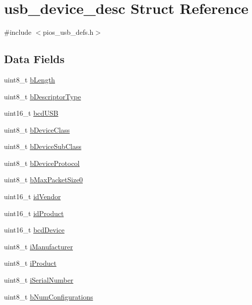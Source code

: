 \hypertarget{structusb__device__desc}{\section{usb\-\_\-device\-\_\-desc \-Struct \-Reference}
\label{structusb__device__desc}
}


{\ttfamily \#include $<$pios\-\_\-usb\-\_\-defs.\-h$>$}

\subsection*{\-Data \-Fields}
\begin{DoxyCompactItemize}
\item 
uint8\-\_\-t \hyperlink{group___p_i_o_s___u_s_b___d_e_f_s_gae982ead8e11c6f9bd465132001f83c11}{b\-Length}
\item 
uint8\-\_\-t \hyperlink{group___p_i_o_s___u_s_b___d_e_f_s_gaa704e180aaabca3aa213472f102bd91e}{b\-Descriptor\-Type}
\item 
uint16\-\_\-t \hyperlink{group___p_i_o_s___u_s_b___d_e_f_s_ga9f1c1b7e10dd6118532befba9204375c}{bcd\-U\-S\-B}
\item 
uint8\-\_\-t \hyperlink{group___p_i_o_s___u_s_b___d_e_f_s_ga04601bd230a37ec17da04c14036b4094}{b\-Device\-Class}
\item 
uint8\-\_\-t \hyperlink{group___p_i_o_s___u_s_b___d_e_f_s_ga020d77d32b45dfd9fe9991cd975dddd7}{b\-Device\-Sub\-Class}
\item 
uint8\-\_\-t \hyperlink{group___p_i_o_s___u_s_b___d_e_f_s_ga3d64799ad816edeb66ecba053618b8aa}{b\-Device\-Protocol}
\item 
uint8\-\_\-t \hyperlink{group___p_i_o_s___u_s_b___d_e_f_s_gaf24518f19202bda273da937e32dff924}{b\-Max\-Packet\-Size0}
\item 
uint16\-\_\-t \hyperlink{group___p_i_o_s___u_s_b___d_e_f_s_ga4bafd49b2f07a14cb215c8cfe917ad5a}{id\-Vendor}
\item 
uint16\-\_\-t \hyperlink{group___p_i_o_s___u_s_b___d_e_f_s_gad96a4bfe2eaf1a6556d633bb896a8683}{id\-Product}
\item 
uint16\-\_\-t \hyperlink{group___p_i_o_s___u_s_b___d_e_f_s_ga4c68faa7a3ea8607c0d9aeb9cc755169}{bcd\-Device}
\item 
uint8\-\_\-t \hyperlink{group___p_i_o_s___u_s_b___d_e_f_s_gabaeafe49bb2dac8e1a9d55a693300c6d}{i\-Manufacturer}
\item 
uint8\-\_\-t \hyperlink{group___p_i_o_s___u_s_b___d_e_f_s_ga1aa83bdef33f6f67cef07ee0e0cbe7b1}{i\-Product}
\item 
uint8\-\_\-t \hyperlink{group___p_i_o_s___u_s_b___d_e_f_s_gae04d0f21a04c4db709e0a05dcb9ecd3a}{i\-Serial\-Number}
\item 
uint8\-\_\-t \hyperlink{group___p_i_o_s___u_s_b___d_e_f_s_ga65e3f56a6dc737eb78053a7ad50d75f8}{b\-Num\-Configurations}
\end{DoxyCompactItemize}


